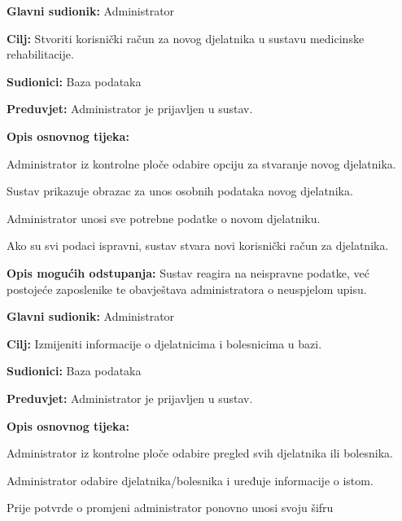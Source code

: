 	\item \textbf{Glavni sudionik:} Administrator
	\item \textbf{Cilj:} Stvoriti korisnički račun za novog djelatnika u sustavu medicinske rehabilitacije.
	\item \textbf{Sudionici:} Baza podataka
	\item \textbf{Preduvjet:} Administrator je prijavljen u sustav.
	\item \textbf{Opis osnovnog tijeka:}
	\begin{packed_enum}
		\item Administrator iz kontrolne ploče odabire opciju za stvaranje novog djelatnika.
		\item Sustav prikazuje obrazac za unos osobnih podataka novog djelatnika.
		\item Administrator unosi sve potrebne podatke o novom djelatniku.
		\item Ako su svi podaci ispravni, sustav stvara novi korisnički račun za djelatnika.
	\end{packed_enum}
	\item \textbf{Opis mogućih odstupanja:}
	Sustav reagira na neispravne podatke, već postojeće zaposlenike te obavještava administratora o neuspjelom upisu.
\closeusecase


	\item \textbf{Glavni sudionik:} Administrator
	\item \textbf{Cilj:} Izmijeniti informacije o djelatnicima i bolesnicima u bazi.
	\item \textbf{Sudionici:} Baza podataka
	\item \textbf{Preduvjet:} Administrator je prijavljen u sustav.
	\item \textbf{Opis osnovnog tijeka:}
	\begin{packed_enum}
		\item Administrator iz kontrolne ploče odabire pregled svih djelatnika ili bolesnika.
		\item Administrator odabire djelatnika/bolesnika i uređuje informacije o istom.
        \item Prije potvrde o promjeni administrator ponovno unosi svoju šifru
	\end{packed_enum}
\closeusecase

